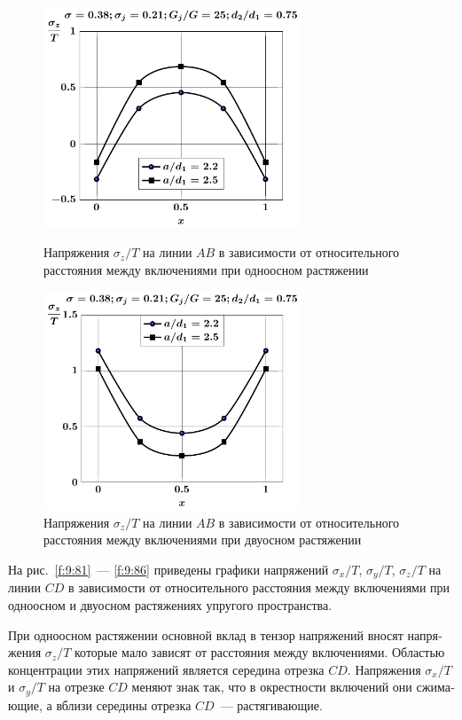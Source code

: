 \begin{russian}
\begin{figure}[h!]
\centering\footnotesize
\parbox[b]{7.5cm}{\centering\includegraphics[width=7.7cm]{inc13-a-d75-g25-t1-sig_z-ab.pdf}
\caption{Напряжения $\sigma_z/T$ на линии $AB$ в зависимости от относительного расстояния между включениями при одноосном растяжении
\label{f:9:79}}}\hfil\hfil
\parbox[b]{7.5cm}{\centering\includegraphics[width=7.7cm]{inc13-a-d75-g25-t2-sig_z-ab.pdf}
\caption{Напряжения $\sigma_z/T$ на линии $AB$ в зависимости от относительного расстояния между включениями при двуосном растяжении
\label{f:9:80}}}
\end{figure}

На рис.~\ref{f:9:81}~--- \ref{f:9:86} приведены графики напряжений $\sigma_x/T$, $\sigma_y/T$, $\sigma_z/T$ на линии $CD$ в зависимости от относительного расстояния между включениями при одноосном и двуосном растяжениях упругого пространства.

При одноосном растяжении основной вклад в тензор напряжений вносят напряжения $\sigma_z/T$ которые мало зависят от расстояния между включениями. Областью концентрации этих напряжений является середина отрезка $CD$. Напряжения $\sigma_x/T$ и $\sigma_y/T$ на отрезке $CD$ меняют знак так, что в окрестности включений они сжимающие, а вблизи середины отрезка $CD$~--- растягивающие.


\end{russian}
